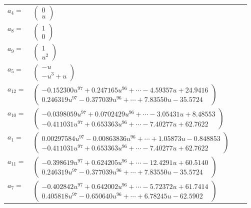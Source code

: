 \documentclass[1p]{elsarticle_modified}
\theoremstyle{definition}
\begin{document}
\begin{tabular}{m{7pt} m{180pt} m{7pt} m{180pt} }
\flushright $a_{4}=$&$\begin{pmatrix}0\\u\end{pmatrix}$ \\
\flushright $a_{8}=$&$\begin{pmatrix}1\\0\end{pmatrix}$ \\
\flushright $a_{9}=$&$\begin{pmatrix}1\\u^2\end{pmatrix}$ \\
\flushright $a_{5}=$&$\begin{pmatrix}- u\\- u^3+u\end{pmatrix}$ \\
\flushright $a_{12}=$&$\begin{pmatrix}-0.152300 u^{97}+0.247165 u^{96}+\cdots-4.59357 u+24.9416\\0.246319 u^{97}-0.377039 u^{96}+\cdots+7.83550 u-35.5724\end{pmatrix}$ \\
\flushright $a_{10}=$&$\begin{pmatrix}-0.0398059 u^{97}+0.0702429 u^{96}+\cdots-3.05431 u+8.48553\\-0.411031 u^{97}+0.653363 u^{96}+\cdots-7.40277 u+62.7622\end{pmatrix}$ \\
\flushright $a_{1}=$&$\begin{pmatrix}0.00297584 u^{97}-0.00863836 u^{96}+\cdots+1.05873 u-0.848853\\-0.411031 u^{97}+0.653363 u^{96}+\cdots-7.40277 u+62.7622\end{pmatrix}$ \\
\flushright $a_{11}=$&$\begin{pmatrix}-0.398619 u^{97}+0.624205 u^{96}+\cdots-12.4291 u+60.5140\\0.246319 u^{97}-0.377039 u^{96}+\cdots+7.83550 u-35.5724\end{pmatrix}$ \\
\flushright $a_{7}=$&$\begin{pmatrix}-0.402842 u^{97}+0.642002 u^{96}+\cdots-5.72372 u+61.7414\\0.405818 u^{97}-0.650640 u^{96}+\cdots+6.78245 u-62.5902\end{pmatrix}$ \\

\end{tabular}
\end{document}
